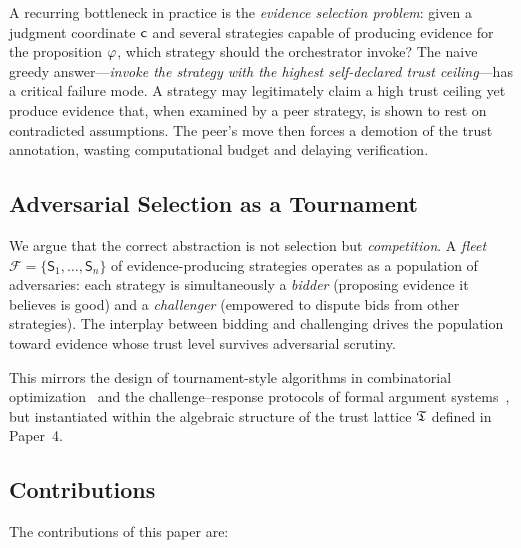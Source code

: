 \documentclass[11pt]{article}
\providecommand{\Fleet}{\mathcal{F}}              %
\providecommand{\Strat}{\mathsf{S}}               %
\begin{document}
A recurring bottleneck in practice is the \emph{evidence selection problem}:
given a judgment coordinate $\mathsf{c}$ and several strategies capable of
producing evidence for the proposition $\varphi$, which strategy should the
orchestrator invoke?  The naive greedy answer---\emph{invoke the strategy with
the highest self-declared trust ceiling}---has a critical failure mode.  A
strategy may legitimately claim a high trust ceiling yet produce evidence that,
when examined by a peer strategy, is shown to rest on contradicted assumptions.
The peer's \CHALLENGE{} move then forces a demotion of the trust annotation,
wasting computational budget and delaying verification.

\subsection{Adversarial Selection as a Tournament}

We argue that the correct abstraction is not selection but \emph{competition}.
A \emph{fleet} $\Fleet = \{\Strat_1, \ldots, \Strat_n\}$ of evidence-producing
strategies operates as a population of adversaries: each strategy is
simultaneously a \emph{bidder} (proposing evidence it believes is good) and a
\emph{challenger} (empowered to dispute bids from other strategies).  The
interplay between bidding and challenging drives the population toward evidence
whose trust level survives adversarial scrutiny.

This mirrors the design of tournament-style algorithms in combinatorial
optimization~\cite{Gold89} and the challenge--response protocols of formal
argument systems~\cite{Dung95}, but instantiated within the algebraic
structure of the trust lattice $\mathfrak{T}$ defined in Paper~4.

\subsection{Contributions}

The contributions of this paper are:
\end{document}
